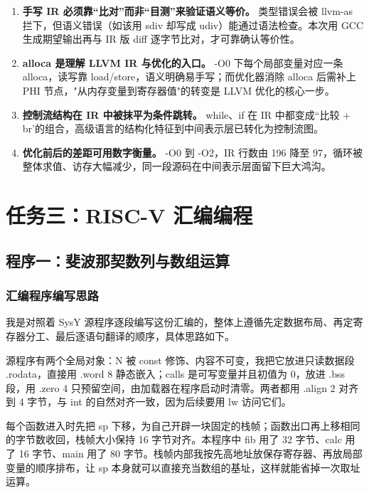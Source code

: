 \documentclass[UTF8,a4paper,10pt]{ctexart}
\newcommand{\hfour}[1]{\par\vspace{0.55em}\noindent{\bfseries #1}\par\vspace{0.25em}}
\begin{document}
\begin{enumerate}[1.]
  \item \textbf{手写 IR 必须靠“比对”而非“目测”来验证语义等价。} 类型错误会被 llvm-as 拦下，但语义错误（如该用 sdiv 却写成 udiv）能通过语法检查。本次用 GCC 生成期望输出再与 IR 版 diff 逐字节比对，才可靠确认等价性。

  \item \textbf{alloca 是理解 LLVM IR 与优化的入口。} -O0 下每个局部变量对应一条 alloca，读写靠 load/store，语义明确易手写；而优化器消除 alloca 后需补上 PHI 节点，"从内存变量到寄存器值"的转变是 LLVM 优化的核心一步。

  \item \textbf{控制流结构在 IR 中被抹平为条件跳转。} while、if 在 IR 中都变成“比较 + br'的组合，高级语言的结构化特征到中间表示层已转化为控制流图。

  \item \textbf{优化前后的差距可用数字衡量。} -O0 到 -O2，IR 行数由 196 降至 97，循环被整体求值、访存大幅减少，同一段源码在中间表示层面留下巨大鸿沟。
\end{enumerate}

\section{任务三：RISC-V 汇编编程}

\subsection{程序一：斐波那契数列与数组运算}

\subsubsection{汇编程序编写思路}

我是对照着 SysY 源程序逐段编写这份汇编的，整体上遵循先定数据布局、再定寄存器分工、最后逐语句翻译的顺序，具体思路如下。

\hfour{1. 全局数据的段归属}

源程序有两个全局对象：N 被 const 修饰、内容不可变，我把它放进只读数据段 .rodata，直接用 .word 8 静态嵌入；calls 是可写变量并且初值为 0，放进 .bss 段，用 .zero 4 只预留空间，由加载器在程序启动时清零。两者都用 .align 2 对齐到 4 字节，与 int 的自然对齐一致，因为后续要用 lw 访问它们。

\hfour{2. 栈帧的分配}

每个函数进入时先把 sp 下移，为自己开辟一块固定的栈帧；函数出口再上移相同的字节数收回，栈帧大小保持 16 字节对齐。本程序中 fib 用了 32 字节、calc 用了 16 字节、main 用了 80 字节。栈帧内部我按先高地址放保存寄存器、再放局部变量的顺序排布，让 sp 本身就可以直接充当数组的基址，这样就能省掉一次取址运算。
\end{document}
